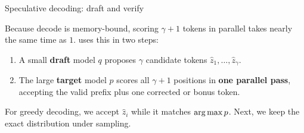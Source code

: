 \documentclass[11pt,aspectratio=169]{beamer}
\begin{document}
\begin{frame}{Speculative decoding: draft and verify}
    \setlength{\parskip}{4pt}

    Because decode is memory-bound, scoring $\gamma+1$ tokens in parallel
    takes nearly the same time as $1$.  uses
    this in two steps:
    {\small
    \begin{enumerate}
        \setlength{\itemsep}{1pt}
        \item A small \textbf{draft} model $q$ proposes $\gamma$ candidate
              tokens $\hat{z}_1,\ldots,\hat{z}_\gamma$.
        \item The large \textbf{target} model $p$ scores all $\gamma+1$
              positions in \textbf{one parallel pass}, accepting the valid
              prefix plus one corrected or bonus token.
    \end{enumerate}}

    \centering
    
    \par\vspace{-0.2em}
    \justifying

    {\small For greedy decoding, we accept $\hat{z}_i$ while it matches
    $\operatorname*{arg\,max} p$. Next, we keep the exact distribution under sampling.}


\end{frame}
\end{document}
